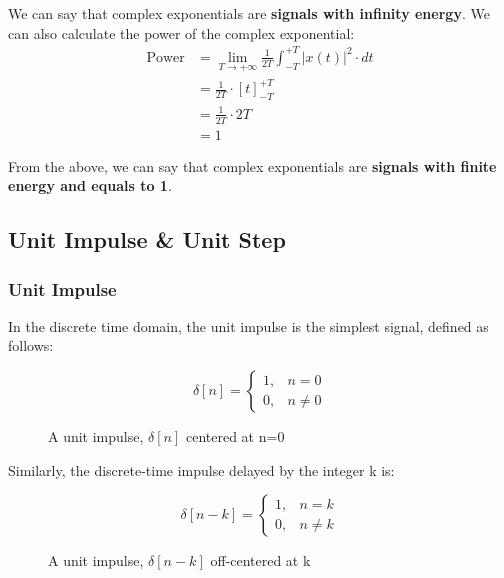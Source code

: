 \documentclass[letterpaper,12pt]{article}
\begin{document}
We can say that complex exponentials are \textbf{signals with infinity energy}. We can also calculate the power of the complex exponential:
\begin{equation*}
    \begin{aligned}
        \text{Power} & = \lim_{T \to +\infty} \frac{1}{2T}\int_{-T}^{+T}\left|x\left(t\right)\right|^{2}\cdot dt \\
                     & = \frac{1}{2T}\cdot[t]^{+T}_{-T}                                                          \\
                     & = \frac{1}{2T}\cdot2T                                                                     \\
                     & = 1
    \end{aligned}
\end{equation*}

From the above, we can say that complex exponentials are \textbf{signals with finite energy and equals to 1}.

\subsection*{Unit Impulse \& Unit Step}
\subsubsection*{Unit Impulse}
In the discrete time domain, the unit impulse is the simplest signal, defined as follows:

\[\delta[n] =
    \begin{cases}
        1, & n = 0    \\
        0, & n \neq 0
    \end{cases}
\]

\begin{figure}[!ht]
    \centering
    
    \caption{A unit impulse, $\delta[n]$ centered at n=0}\label{fig:unit_impulse}
\end{figure}

Similarly, the discrete-time impulse delayed by the integer k is:

\[\delta[n - k] =
    \begin{cases}
        1, & n = k    \\
        0, & n \neq k
    \end{cases}
\]

\begin{figure}[!ht]
    \centering
    
    \caption{A unit impulse, $\delta[n-k]$ off-centered at k}
    \label{fig:unit_impulse_off_center}
\end{figure}
\end{document}
